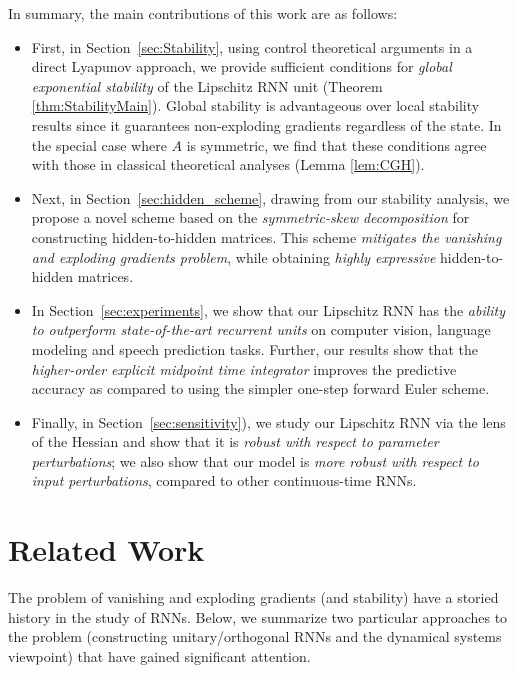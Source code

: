 \documentclass{article} \usepackage{iclr2021_conference,times}
\begin{document}
In summary, the main contributions of this work are as follows:
\begin{itemize}\vspace{-0.15cm}
	\item First, in Section~\ref{sec:Stability}, using control theoretical arguments in a direct Lyapunov approach, we provide sufficient conditions for \emph{global exponential stability} of the Lipschitz RNN unit (Theorem \ref{thm:StabilityMain}). Global stability is advantageous over local stability results since it guarantees non-exploding gradients regardless of the state. In the special case where $A$ is symmetric, we find that these conditions agree with those in classical theoretical analyses (Lemma \ref{lem:CGH}).


	\item Next, in Section~\ref{sec:hidden_scheme}, drawing from our stability analysis, we propose a novel scheme based on the \emph{symmetric-skew decomposition} for constructing hidden-to-hidden matrices. This scheme \emph{mitigates the vanishing and exploding gradients problem}, while obtaining \emph{highly expressive} hidden-to-hidden matrices.
	
	\item In Section~\ref{sec:experiments}, we show that our Lipschitz RNN has the \emph{ability to outperform state-of-the-art recurrent units} on computer vision, language modeling and speech prediction tasks.
Further, our results show that the \emph{higher-order explicit midpoint time integrator} improves the predictive accuracy as compared to using the simpler one-step forward Euler scheme.  

	\item 
	Finally, in Section~\ref{sec:sensitivity}), we study our Lipschitz RNN via the lens of the Hessian and show that it is \emph{robust with respect to parameter perturbations}; we also show that our model is \emph{more robust with respect to input perturbations}, compared to other continuous-time RNNs.
	
\end{itemize}



\section{Related Work}

The problem of vanishing and exploding gradients (and stability) have a storied history in the study of RNNs.
Below, we summarize two particular approaches to the problem (constructing unitary/orthogonal RNNs and the dynamical systems viewpoint) that have gained significant attention.
\end{document}
